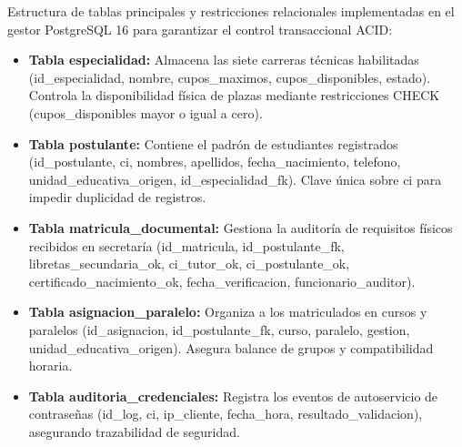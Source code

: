 
Estructura de tablas principales y restricciones relacionales implementadas en el gestor PostgreSQL 16 para garantizar el control transaccional ACID:

\begin{itemize}
    \item \textbf{Tabla especialidad:} Almacena las siete carreras técnicas habilitadas (id\_especialidad, nombre, cupos\_maximos, cupos\_disponibles, estado). Controla la disponibilidad física de plazas mediante restricciones CHECK (cupos\_disponibles mayor o igual a cero).
    \item \textbf{Tabla postulante:} Contiene el padrón de estudiantes registrados (id\_postulante, ci, nombres, apellidos, fecha\_nacimiento, telefono, unidad\_educativa\_origen, id\_especialidad\_fk). Clave única sobre ci para impedir duplicidad de registros.
    \item \textbf{Tabla matricula\_documental:} Gestiona la auditoría de requisitos físicos recibidos en secretaría (id\_matricula, id\_postulante\_fk, libretas\_secundaria\_ok, ci\_tutor\_ok, ci\_postulante\_ok, certificado\_nacimiento\_ok, fecha\_verificacion, funcionario\_auditor).
    \item \textbf{Tabla asignacion\_paralelo:} Organiza a los matriculados en cursos y paralelos (id\_asignacion, id\_postulante\_fk, curso, paralelo, gestion, unidad\_educativa\_origen). Asegura balance de grupos y compatibilidad horaria.
    \item \textbf{Tabla auditoria\_credenciales:} Registra los eventos de autoservicio de contraseñas (id\_log, ci, ip\_cliente, fecha\_hora, resultado\_validacion), asegurando trazabilidad de seguridad.
\end{itemize}
